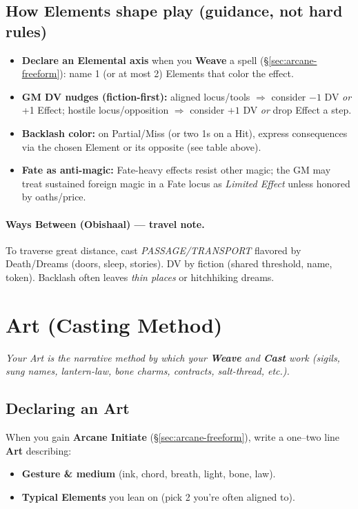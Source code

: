 \documentclass[11pt]{article}
\begin{document}
\subsection*{How Elements shape play (guidance, not hard rules)}
\begin{itemize}
  \item \textbf{Declare an Elemental axis} when you \textbf{Weave} a spell (\S\ref{sec:arcane-freeform}): name 1 (or at most 2) Elements that color the effect.
  \item \textbf{GM DV nudges (fiction-first):} aligned locus/tools \(\Rightarrow\) consider \(-1\) DV \emph{or} +1 Effect; hostile locus/opposition \(\Rightarrow\) consider \(+1\) DV \emph{or} drop Effect a step.
  \item \textbf{Backlash color:} on Partial/Miss (or two 1s on a Hit), express consequences via the chosen Element or its opposite (see table above).
  \item \textbf{Fate as anti-magic:} Fate-heavy effects resist other magic; the GM may treat sustained foreign magic in a Fate locus as \emph{Limited Effect} unless honored by oaths/price.
\end{itemize}

\paragraph{Ways Between (Obishaal) — travel note.}
To traverse great distance, cast \emph{PASSAGE/TRANSPORT} flavored by Death/Dreams (doors, sleep, stories). DV by fiction (shared threshold, name, token). Backlash often leaves \emph{thin places} or hitchhiking dreams.

\bigskip


\section{Art (Casting Method)}
\label{sec:art}

\textit{Your \emph{Art} is the narrative method by which your \textbf{Weave} and \textbf{Cast} work (sigils, sung names, lantern-law, bone charms, contracts, salt-thread, etc.).}

\subsection*{Declaring an Art}
When you gain \textbf{Arcane Initiate} (\S\ref{sec:arcane-freeform}), write a one–two line \textbf{Art} describing:
\begin{itemize}
  \item \textbf{Gesture \& medium} (ink, chord, breath, light, bone, law).
  \item \textbf{Typical Elements} you lean on (pick 2 you're often aligned to).
\end{itemize}
\end{document}
